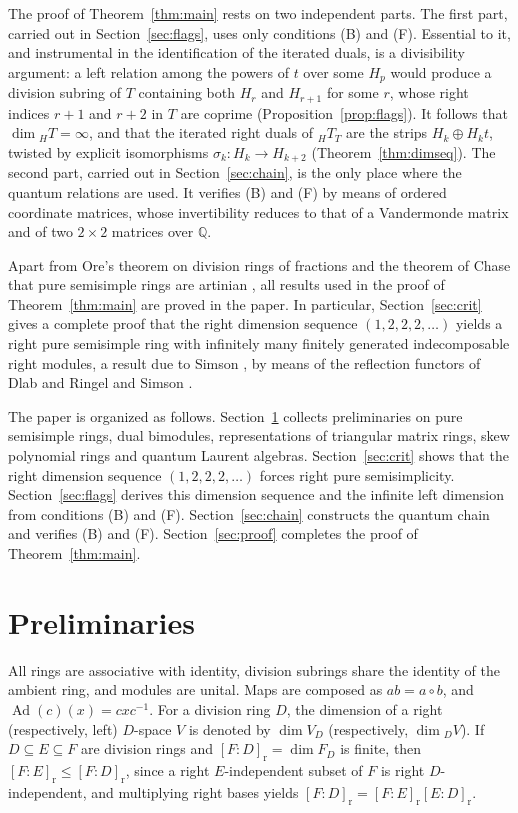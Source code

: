\documentclass[11pt,a4paper]{amsart}
\numberwithin{equation}{section}
\newcommand{\Ad}{\operatorname{Ad}}
\newcommand{\Q}{\mathbb{Q}}
\newcommand{\rr}{\mathrm{r}}
\begin{document}
The proof of Theorem~\ref{thm:main} rests on two independent parts. The first part, carried out in Section~\ref{sec:flags}, uses only conditions (B) and (F). Essential to it, and instrumental in the identification of the iterated duals, is a divisibility argument: a left relation among the powers of $t$ over some $H_p$ would produce a division subring of $T$ containing both $H_r$ and $H_{r+1}$ for some $r$, whose right indices $r+1$ and $r+2$ in $T$ are coprime (Proposition~\ref{prop:flags}). It follows that $\dim{}_HT=\infty$, and that the iterated right duals of ${}_HT_T$ are the strips $H_k\oplus H_kt$, twisted by explicit isomorphisms $\sigma_k\colon H_k\to H_{k+2}$ (Theorem~\ref{thm:dimseq}). The second part, carried out in Section~\ref{sec:chain}, is the only place where the quantum relations are used. It verifies (B) and (F) by means of ordered coordinate matrices, whose invertibility reduces to that of a Vandermonde matrix and of two $2\times2$ matrices over $\Q$.

Apart from Ore's theorem on division rings of fractions \cite{Co,GW} and the theorem of Chase that pure semisimple rings are artinian \cite{Ch}, all results used in the proof of Theorem~\ref{thm:main} are proved in the paper. In particular, Section~\ref{sec:crit} gives a complete proof that the right dimension sequence $(1,2,2,2,\dots)$ yields a right pure semisimple ring with infinitely many finitely generated indecomposable right modules, a result due to Simson \cite{Si97}, by means of the reflection functors of Dlab and Ringel \cite{DR} and Simson \cite{Si81}.

The paper is organized as follows. Section~\ref{sec:prelim} collects preliminaries on pure semisimple rings, dual bimodules, representations of triangular matrix rings, skew polynomial rings and quantum Laurent algebras. Section~\ref{sec:crit} shows that the right dimension sequence $(1,2,2,2,\dots)$ forces right pure semisimplicity. Section~\ref{sec:flags} derives this dimension sequence and the infinite left dimension from conditions (B) and (F). Section~\ref{sec:chain} constructs the quantum chain and verifies (B) and (F). Section~\ref{sec:proof} completes the proof of Theorem~\ref{thm:main}.

\section{Preliminaries}\label{sec:prelim}

All rings are associative with identity, division subrings share the identity of the ambient ring, and modules are unital. Maps are composed as $ab=a\circ b$, and $\Ad(c)(x)=cxc^{-1}$. For a division ring $D$, the dimension of a right (respectively, left) $D$-space $V$ is denoted by $\dim V_D$ (respectively, $\dim{}_DV$). If $D\subseteq E\subseteq F$ are division rings and $[F:D]_{\rr}=\dim F_D$ is finite, then $[F:E]_{\rr}\le[F:D]_{\rr}$, since a right $E$-independent subset of $F$ is right $D$-independent, and multiplying right bases yields $[F:D]_{\rr}=[F:E]_{\rr}[E:D]_{\rr}$.
\end{document}
